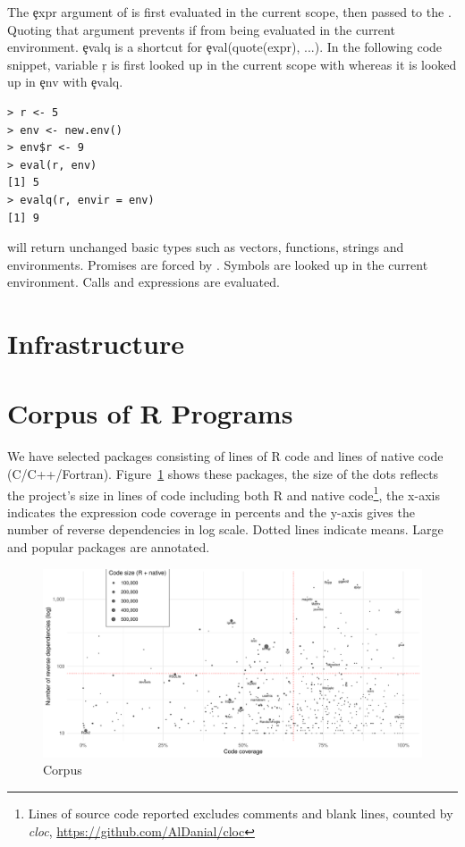 \documentclass[conference]{IEEEtran}
\begin{document}
The \c{expr} argument of \eval is first evaluated in the current scope, then passed to the \eval. Quoting that argument prevents if from being evaluated in the current environment. \c{evalq} is a shortcut for \c{eval(quote(expr), ...)}. In the following code snippet, variable \c{r} is first looked up in the current scope with \eval whereas it is looked up in \c{env} with \c{evalq}.

\begin{lstlisting}
> r <- 5
> env <- new.env()
> env$r <- 9
> eval(r, env)
[1] 5
> evalq(r, envir = env)
[1] 9
\end{lstlisting}

\eval will return unchanged basic types such as vectors, functions, strings and environments. Promises are forced by \eval. Symbols are looked up in the current environment. Calls and expressions are evaluated. 

\section{Infrastructure}


\section{Corpus of R Programs}

We have selected \CorpusPackages packages consisting of \CorpusRCodeRnd lines of
R code and \CorpusNativeCodeRnd lines of native code (C/C++/Fortran).
Figure~\ref{fig:corpus} shows these packages, the size of the dots reflects the
project's size in lines of code including both R and native code\footnote{Lines
  of source code reported excludes comments and blank lines, counted by
  \emph{cloc}, \cf \url{https://github.com/AlDanial/cloc}}, the x-axis indicates
the expression code coverage in percents and the y-axis gives the number of
reverse dependencies in log scale. Dotted lines indicate means. Large and
popular packages are annotated.

\begin{figure}[!tb]\centering\includegraphics[width=.9\linewidth]
  {corpus.pdf}\caption{Corpus}\label{fig:corpus}
\end{figure}
\end{document}
